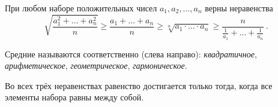 \resetproblem \begingroup %
    \def\jeolmdate{24 октября 2018 г.}%
    \def\jeolmauthors{Орлов~О.\,П., Тихонов~Ю.\,В.}%
\jeolmheader \endgroup


При любом наборе положительных чисел $a_{1}, a_{2}, \ldots, a_{n}$ верны неравенства
\[
    \sqrt{\frac{a_{1}^2 + \ldots + a_{n}^2}{n}}
\geq
    \frac{a_{1} + \ldots + a_{n}}{n}
\geq
    \sqrt[n]{a_{1} \cdot \ldots \cdot a_{n}}
\geq
    \frac{n}{\frac{1}{a_{1}} + \ldots + \frac{1}{a_{n}}}
\, . \]

Средние называются соответственно (слева направо):
\textit{квадратичное}, \textit{арифметическое}, \textit{геометрическое}, \textit{гармоническое}.

Во всех трёх неравенствах равенство достигается только тогда, когда все элементы набора равны между собой.

